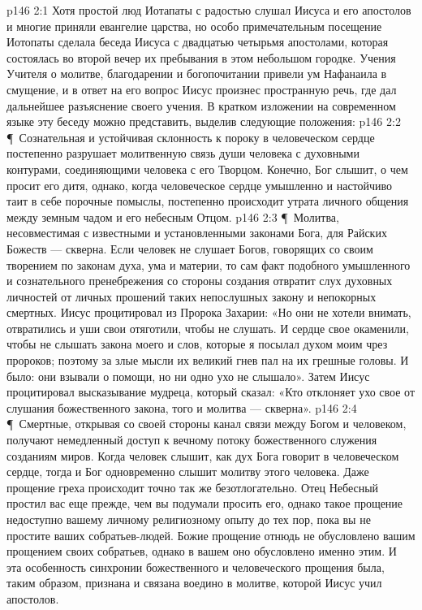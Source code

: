 \vs p146 2:1 Хотя простой люд Иотапаты с радостью слушал Иисуса и его апостолов и многие приняли евангелие царства, но особо примечательным посещение Иотопаты сделала беседа Иисуса с двадцатью четырьмя апостолами, которая состоялась во второй вечер их пребывания в этом небольшом городке. Учения Учителя о молитве, благодарении и богопочитании привели ум Нафанаила в смущение, и в ответ на его вопрос Иисус произнес пространную речь, где дал дальнейшее разъяснение своего учения. В кратком изложении на современном языке эту беседу можно представить, выделив следующие положения:
\vs p146 2:2 \P\ \bibnobreakspace Сознательная и устойчивая склонность к пороку в человеческом сердце постепенно разрушает молитвенную связь души человека с духовными контурами, соединяющими человека с его Творцом. Конечно, Бог слышит, о чем просит его дитя, однако, когда человеческое сердце умышленно и настойчиво таит в себе порочные помыслы, постепенно происходит утрата личного общения между земным чадом и его небесным Отцом.
\vs p146 2:3 \P\ \bibnobreakspace Молитва, несовместимая с известными и установленными законами Бога, для Райских Божеств --- скверна. Если человек не слушает Богов, говорящих со своим творением по законам духа, ума и материи, то сам факт подобного умышленного и сознательного пренебрежения со стороны создания отвратит слух духовных личностей от личных прошений таких непослушных закону и непокорных смертных. Иисус процитировал из Пророка Захарии: «Но они не хотели внимать, отвратились и уши свои отяготили, чтобы не слушать. И сердце свое окаменили, чтобы не слышать закона моего и слов, которые я посылал духом моим чрез пророков; поэтому за злые мысли их великий гнев пал на их грешные головы. И было: они взывали о помощи, но ни одно ухо не слышало». Затем Иисус процитировал высказывание мудреца, который сказал: «Кто отклоняет ухо свое от слушания божественного закона, того и молитва --- скверна».
\vs p146 2:4 \P\ \bibnobreakspace Смертные, открывая со своей стороны канал связи между Богом и человеком, получают немедленный доступ к вечному потоку божественного служения созданиям миров. Когда человек слышит, как дух Бога говорит в человеческом сердце, тогда и Бог одновременно слышит молитву этого человека. Даже прощение греха происходит точно так же безотлогательно. Отец Небесный простил вас еще прежде, чем вы подумали просить его, однако такое прощение недоступно вашему личному религиозному опыту до тех пор, пока вы не простите ваших собратьев\hyp{}людей.  Божие прощение отнюдь не обусловлено вашим прощением своих собратьев, однако в вашем  оно обусловлено именно этим. И эта особенность синхронии божественного и человеческого прощения была, таким образом, признана и связана воедино в молитве, которой Иисус учил апостолов.
